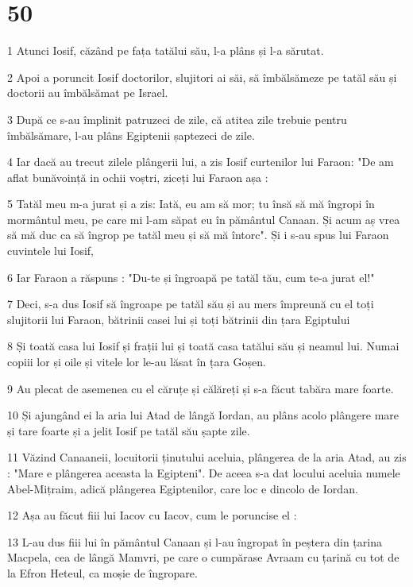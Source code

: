 \chapter{50}

\par 1 Atunci Iosif, căzând pe fața tatălui său, l-a plâns și l-a sărutat.
\par 2 Apoi a poruncit Iosif doctorilor, slujitori ai săi, să îmbălsămeze pe tatăl său și doctorii au îmbălsămat pe Israel.
\par 3 După ce s-au împlinit patruzeci de zile, că atitea zile trebuie pentru îmbălsămare, l-au plâns Egiptenii șaptezeci de zile.
\par 4 Iar dacă au trecut zilele plângerii lui, a zis Iosif curtenilor lui Faraon: "De am aflat bunăvoință in ochii voștri, ziceți lui Faraon așa :
\par 5 Tatăl meu m-a jurat și a zis: Iată, eu am să mor; tu însă să mă îngropi în mormântul meu, pe care mi l-am săpat eu în pământul Canaan. Și acum aș vrea să mă duc ca să îngrop pe tatăl meu și să mă întorc". Și i s-au spus lui Faraon cuvintele lui Iosif,
\par 6 Iar Faraon a răspuns : "Du-te și îngroapă pe tatăl tău, cum te-a jurat el!"
\par 7 Deci, s-a dus Iosif să îngroape pe tatăl său și au mers împreună cu el toți slujitorii lui Faraon, bătrinii casei lui și toți bătrinii din țara Egiptului
\par 8 Și toată casa lui Iosif și frații lui și toată casa tatălui său și neamul lui. Numai copiii lor și oile și vitele lor le-au lăsat în țara Goșen.
\par 9 Au plecat de asemenea cu el căruțe și călăreți și s-a făcut tabăra mare foarte.
\par 10 Și ajungând ei la aria lui Atad de lângă Iordan, au plâns acolo plângere mare și tare foarte și a jelit Iosif pe tatăl său șapte zile.
\par 11 Văzind Canaaneii, locuitorii ținutului aceluia, plângerea de la aria Atad, au zis : "Mare e plângerea aceasta la Egipteni". De aceea s-a dat locului aceluia numele Abel-Mițraim, adică plângerea Egiptenilor, care loc e dincolo de Iordan.
\par 12 Așa au făcut fiii lui Iacov cu Iacov, cum le poruncise el :
\par 13 L-au dus fiii lui în pământul Canaan și l-au îngropat în peștera din țarina Macpela, cea de lângă Mamvri, pe care o cumpărase Avraam cu țarină cu tot de la Efron Heteul, ca moșie de îngropare.
